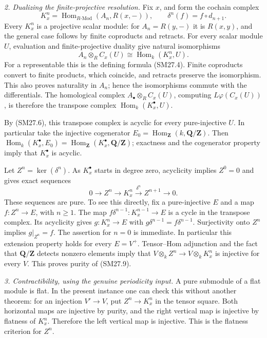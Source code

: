 \documentclass[11pt,a4paper]{article}
\theoremstyle{definition}\newtheorem{definition}[theorem]{Definition}
\theoremstyle{remark}\newtheorem{remark}[theorem]{Remark}
\begin{document}
\emph{2. Dualizing the finite-projective resolution.}
Fix \(x\), and form the cochain complex
\[
 K_x^n=\operatorname{Hom}_{R\text{-}\mathrm{Mod}}
                (A_n,R(x,-)),\qquad
 \delta^n(f)=f\circ d_{n+1}.
 \tag{SM27.7}
\]
Every \(K_x^n\) is a projective scalar module: for
\(A_n=R(y,-)\) it is \(R(x,y)\), and the general case follows by
finite coproducts and retracts.  For every scalar module \(U\),
evaluation and finite-projective duality give natural isomorphisms
\[
 A_n\otimes_R C_x(U)
   \cong\operatorname{Hom}_k(K_x^n,U).
 \tag{SM27.8}
\]
For a representable this is the defining formula (SM27.4).
Finite coproducts convert to finite products, which coincide, and
retracts preserve the isomorphism.  This also proves naturality in
\(A_n\); hence the isomorphisms commute with the differentials.
The homological complex \(A_\bullet\otimes_R C_x(U)\), computing
\(L\varphi(C_x(U))\), is therefore the transpose complex
\(\operatorname{Hom}_k(K_x^\bullet,U)\).

By (SM27.6), this transpose complex is acyclic for every pure-injective
\(U\).  In particular take the injective cogenerator
\(E_0=\operatorname{Hom}_{\mathbf Z}(k,\mathbf Q/\mathbf Z)\).
Then
\(\operatorname{Hom}_k(K_x^\bullet,E_0)
 =\operatorname{Hom}_{\mathbf Z}(K_x^\bullet,\mathbf Q/\mathbf Z)\);
exactness and the cogenerator property imply that \(K_x^\bullet\)
is acyclic.

Let \(Z^n=\ker(\delta^n)\).  As \(K_x^\bullet\) starts in degree zero,
acyclicity implies \(Z^0=0\) and gives exact sequences
\[
 0\longrightarrow Z^n\longrightarrow K_x^n
   \xrightarrow{\delta^n}Z^{n+1}\longrightarrow0.
 \tag{SM27.9}
\]
These sequences are pure.  To see this directly, fix a pure-injective
\(E\) and a map \(f:Z^n\to E\), with \(n\ge1\).
The map \(f\delta^{n-1}:K_x^{n-1}\to E\) is a cycle in the
transpose complex.  Its acyclicity gives \(g:K_x^n\to E\) with
\(g\delta^{n-1}=f\delta^{n-1}\).  Surjectivity onto \(Z^n\)
implies \(g|_{Z^n}=f\).  The assertion for \(n=0\) is immediate.
In particular this extension property holds for every \(E=V^+\).
Tensor--Hom adjunction and the fact that
\(\mathbf Q/\mathbf Z\) detects nonzero elements imply that
\(V\otimes_k Z^n\to V\otimes_k K_x^n\) is injective for every
\(V\).  This proves purity of (SM27.9).

\emph{3. Contractibility, using the genuine periodicity input.}
A pure submodule of a flat module is flat.  In the present instance
one can check this without another theorem: for an injection
\(V'\to V\), put \(Z^n\to K_x^n\) in the tensor square.
Both horizontal maps are injective by purity, and the right vertical
map is injective by flatness of \(K_x^n\).  Therefore the left
vertical map is injective.  This is the flatness criterion for
\(Z^n\).
\end{document}
